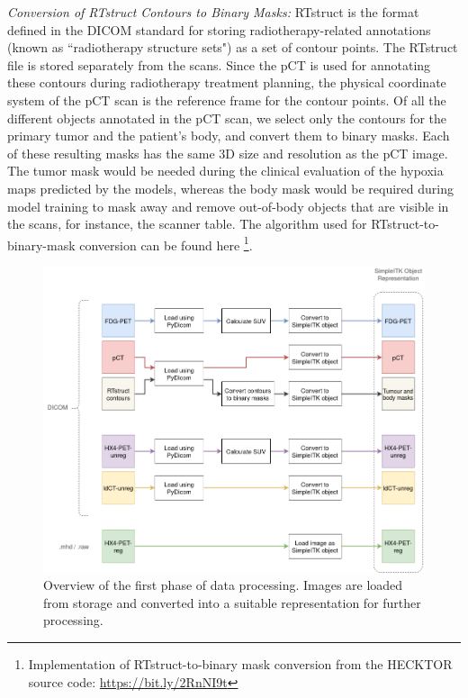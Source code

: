 \vspace{4mm}
\noindent
\textit{Conversion of RTstruct Contours to Binary Masks:} RTstruct is the format defined in the DICOM standard for storing radiotherapy-related annotations (known as ``radiotherapy structure sets") as a set of contour points. The RTstruct file is stored separately from the scans. Since the pCT is used for annotating these contours during radiotherapy treatment planning, the physical coordinate system of the pCT scan is the reference frame for the contour points. Of all the different objects annotated in the pCT scan, we select only the contours for the primary tumor and the patient's body, and convert them to binary masks. Each of these resulting masks has the same 3D size and resolution as the pCT image. The tumor mask would be needed during the clinical evaluation of the hypoxia maps predicted by the models, whereas the body mask would be required during model training to mask away and remove out-of-body objects that are visible in the scans, for instance, the scanner table. The algorithm used for RTstruct-to-binary-mask conversion can be found here \footnote{Implementation of RTstruct-to-binary mask conversion from the HECKTOR source code: \url{https://bit.ly/2RnNI9t}}.

\begin{figure}[h!]
    \centering
    \includegraphics[width=0.9\linewidth]{figures/Data/data_processing_overview-step_1.png}
    \caption{Overview of the first phase of data processing. Images are loaded from storage and converted into a suitable representation for further processing.}
    \label{fig:data_proc_overview_1}
\end{figure}

